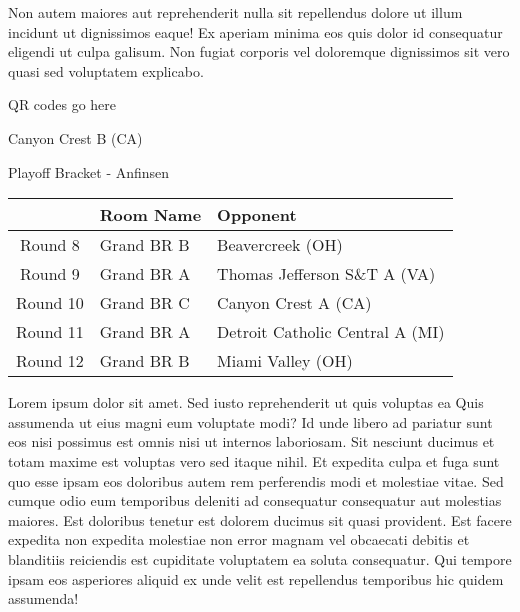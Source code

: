 \documentclass{article}%
\begin{document}
\newline%
Non autem maiores aut reprehenderit nulla sit repellendus dolore ut illum incidunt ut dignissimos eaque! Ex aperiam minima eos quis dolor id consequatur eligendi ut culpa galisum. Non fugiat corporis vel doloremque dignissimos sit vero quasi sed voluptatem explicabo.\newline%
\newline%
%
\vspace*{30pt}%
\begin{center}%
\begin{Huge}%
QR codes go here%
\end{Huge}%
\end{center}%
\newpage%
\begin{center}%
\begin{Huge}%
Canyon Crest B (CA)%
\end{Huge}%
\vspace*{8pt}%
\linebreak%
\begin{Large}%
Playoff Bracket {-} Anfinsen%
\end{Large}%
\end{center}%
%
\begin{tabularx}{\textwidth}{|c|Y|Y|}%
\hline%
&Room Name&Opponent\\%
\hline%
Round 8&Grand BR B&Beavercreek (OH)\\%
Round 9&Grand BR A&Thomas Jefferson S\&T A (VA)\\%
Round 10&Grand BR C&Canyon Crest A (CA)\\%
Round 11&Grand BR A&Detroit Catholic Central A (MI)\\%
Round 12&Grand BR B&Miami Valley (OH)\\%
\hline%
\end{tabularx}%
\vspace*{8pt}%
\linebreak%
\newline%
\newline%
Lorem ipsum dolor sit amet. Sed iusto reprehenderit ut quis voluptas ea Quis assumenda ut eius magni eum voluptate modi? Id unde libero ad pariatur sunt eos nisi possimus est omnis nisi ut internos laboriosam. Sit nesciunt ducimus et totam maxime est voluptas vero sed itaque nihil. Et expedita culpa et fuga sunt quo esse ipsam eos doloribus autem rem perferendis modi et molestiae vitae.\newline%
\newline%
Sed cumque odio eum temporibus deleniti ad consequatur consequatur aut molestias maiores. Est doloribus tenetur est dolorem ducimus sit quasi provident. Est facere expedita non expedita molestiae non error magnam vel obcaecati debitis et blanditiis reiciendis est cupiditate voluptatem ea soluta consequatur. Qui tempore ipsam eos asperiores aliquid ex unde velit est repellendus temporibus hic quidem assumenda!\newline%
\end{document}
